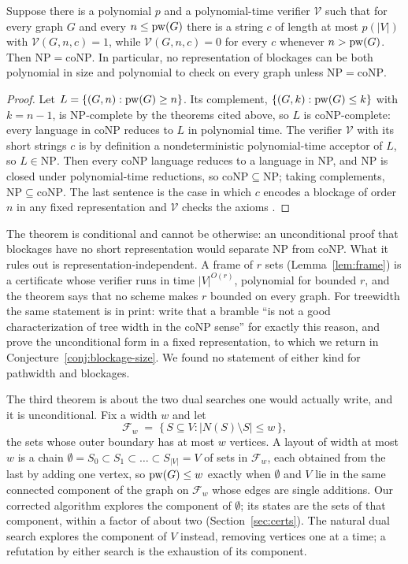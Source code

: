 \begin{theorem}\label{thm:dual-conp}
Suppose there is a polynomial $p$ and a polynomial-time verifier $\mathcal V$
such that for every graph $G$ and every $n\le\mathrm{pw}(G)$ there is a string $c$ of
length at most $p(|V|)$ with $\mathcal V(G,n,c)=1$, while
$\mathcal V(G,n,c)=0$ for every $c$ whenever $n>\mathrm{pw}(G)$. Then
$\mathrm{NP}=\mathrm{coNP}$. In particular, no representation of blockages
can be both polynomial in size and polynomial to check on every graph unless
$\mathrm{NP}=\mathrm{coNP}$.
\end{theorem}
\begin{proof}
Let $L=\{(G,n):\mathrm{pw}(G)\ge n\}$. Its complement, $\{(G,k):\mathrm{pw}(G)\le k\}$ with
$k=n-1$, is NP-complete by the theorems cited above, so $L$ is
coNP-complete: every language in coNP reduces to $L$ in polynomial time. The
verifier $\mathcal V$ with its short strings $c$ is by definition a
nondeterministic polynomial-time acceptor of $L$, so $L\in\mathrm{NP}$. Then
every coNP language reduces to a language in NP, and NP is closed under
polynomial-time reductions, so $\mathrm{coNP}\subseteq\mathrm{NP}$; taking
complements, $\mathrm{NP}\subseteq\mathrm{coNP}$. The last sentence is the
case in which $c$ encodes a blockage of order $n$ in any fixed representation
and $\mathcal V$ checks the axioms
\citep[Chapter~7]{GareyJohnson1979}.
\end{proof}

The theorem is conditional and cannot be otherwise: an unconditional proof
that blockages have no short representation would separate NP from coNP.
What it rules out is representation-independent. A frame of $r$ sets
(Lemma~\ref{lem:frame}) is a certificate whose verifier runs in time
$|V|^{O(r)}$, polynomial for bounded $r$, and the theorem says that no
scheme makes $r$ bounded on every graph. For treewidth the same statement is
in print: \citet{GroheMarx2009} write that a bramble ``is not a good
characterization of tree width in the coNP sense'' for exactly this reason,
and prove the unconditional form in a fixed representation, to which we
return in Conjecture~\ref{conj:blockage-size}. We found no statement of
either kind for pathwidth and blockages.

The third theorem is about the two dual searches one would actually write,
and it is unconditional. Fix a width $w$ and let
\[
\mathcal F_w \;=\; \{\,S\subseteq V : |N(S)\setminus S|\le w\,\},
\]
the sets whose outer boundary has at most $w$ vertices. A layout of width at
most $w$ is a chain $\emptyset=S_0\subset S_1\subset\dots\subset S_{|V|}=V$
of sets in $\mathcal F_w$, each obtained from the last by adding one vertex,
so $\mathrm{pw}(G)\le w$ exactly when $\emptyset$ and $V$ lie in the same connected
component of the graph on $\mathcal F_w$ whose edges are single additions.
Our corrected algorithm explores the component of $\emptyset$; its states
are the sets of that component, within a factor of about two
(Section~\ref{sec:certs}). The natural dual search explores the component of
$V$ instead, removing vertices one at a time; a refutation by either search
is the exhaustion of its component.

